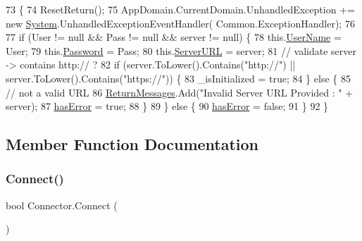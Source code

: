 \begin{DoxyCode}
73                                                               \{
74         ResetReturn();
75         AppDomain.CurrentDomain.UnhandledException += \textcolor{keyword}{new} \mbox{\hyperlink{namespace_system}{System}}.UnhandledExceptionEventHandler(
      Common.ExceptionHandler);
76 
77         \textcolor{keywordflow}{if} (User != null && Pass != null && server != null) \{
78             this.\mbox{\hyperlink{class_connector_a41d247f09774f0ed206ce1a4a2463fed}{UserName}} = User;
79             this.\mbox{\hyperlink{class_connector_a7dd469898462ef761d256392766461fe}{Password}} = Pass;
80             this.\mbox{\hyperlink{class_connector_ac0cae400459978dde8030f75208e48f1}{ServerURL}} = server;
81             \textcolor{comment}{// validate server -> contains http:// ?}
82             \textcolor{keywordflow}{if} (server.ToLower().Contains(\textcolor{stringliteral}{"http://"}) || server.ToLower().Contains(\textcolor{stringliteral}{"https://"})) \{
83                 \_isInitialized = \textcolor{keyword}{true};
84             \} \textcolor{keywordflow}{else} \{
85                 \textcolor{comment}{// not a valid URL}
86                 \mbox{\hyperlink{class_connector_a1ed422674b344524fd77998dcf6a9ba6}{ReturnMessages}}.Add(\textcolor{stringliteral}{"Invalid Server URL Provided : "} + server);
87                 \mbox{\hyperlink{class_connector_a079bae21a5417efa53bfe8954c0f533f}{hasError}} = \textcolor{keyword}{true};
88             \}
89         \} \textcolor{keywordflow}{else} \{
90             \mbox{\hyperlink{class_connector_a079bae21a5417efa53bfe8954c0f533f}{hasError}} = \textcolor{keyword}{false};
91         \}
92     \}
\end{DoxyCode}


\subsection{Member Function Documentation}
\mbox{\label{class_connector_a0dcf8f969c37c4306c567417a872329a}} 
\subsubsection{\texorpdfstring{Connect()}{Connect()}}
{\footnotesize\ttfamily bool Connector.\+Connect (\begin{DoxyParamCaption}{ }\end{DoxyParamCaption})}




